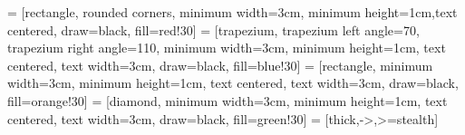 


% 

 = [rectangle, rounded corners, minimum width=3cm, minimum height=1cm,text centered, draw=black, fill=red!30]
 = [trapezium, trapezium left angle=70, trapezium right angle=110, minimum width=3cm, minimum height=1cm, text centered, text width=3cm, draw=black, fill=blue!30]
 = [rectangle, minimum width=3cm, minimum height=1cm, text centered, text width=3cm, draw=black, fill=orange!30]
 = [diamond, minimum width=3cm, minimum height=1cm, text centered, text width=3cm, draw=black, fill=green!30]
 = [thick,->,>=stealth]

